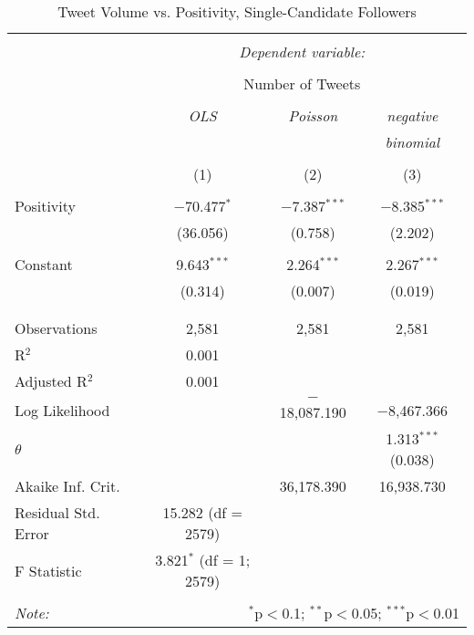 \begin{table}[!htbp] \centering 
  \caption{Tweet Volume vs. Positivity, Single-Candidate Followers} 
  \label{} 
    \begin{tabular}{@{\extracolsep{5pt}}lccc} 
    \\[-1.8ex]\hline 
    \hline \\[-1.8ex] 
     & \multicolumn{3}{c}{\textit{Dependent variable:}} \\ 
    \cline{2-4} 
    \\[-1.8ex] & \multicolumn{3}{c}{Number of Tweets} \\ 
    \\[-1.8ex] & \textit{OLS} & \textit{Poisson} & \textit{negative} \\ 
     & \textit{} & \textit{} & \textit{binomial} \\ 
    \\[-1.8ex] & (1) & (2) & (3)\\ 
    \hline \\[-1.8ex] 
     Positivity & $-$70.477$^{*}$ & $-$7.387$^{***}$ & $-$8.385$^{***}$ \\ 
      & (36.056) & (0.758) & (2.202) \\ 
      & & & \\ 
     Constant & 9.643$^{***}$ & 2.264$^{***}$ & 2.267$^{***}$ \\ 
      & (0.314) & (0.007) & (0.019) \\ 
      & & & \\ 
    \hline \\[-1.8ex] 
    Observations & 2,581 & 2,581 & 2,581 \\ 
    R$^{2}$ & 0.001 &  &  \\ 
    Adjusted R$^{2}$ & 0.001 &  &  \\ 
    Log Likelihood &  & $-$18,087.190 & $-$8,467.366 \\ 
    $\theta$ &  &  & 1.313$^{***}$  (0.038) \\ 
    Akaike Inf. Crit. &  & 36,178.390 & 16,938.730 \\ 
    Residual Std. Error & 15.282 (df = 2579) &  &  \\ 
    F Statistic & 3.821$^{*}$ (df = 1; 2579) &  &  \\ 
    \hline 
    \hline \\[-1.8ex] 
    \textit{Note:}  & \multicolumn{3}{r}{$^{*}$p$<$0.1; $^{**}$p$<$0.05; $^{***}$p$<$0.01} \\ 
    \end{tabular} 
\end{table} 




\clearpage
\newpage 